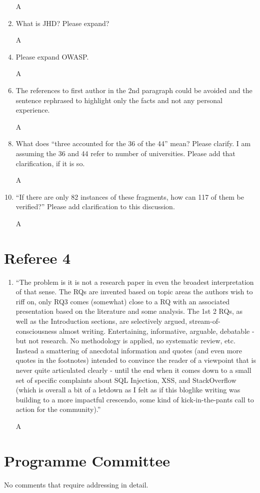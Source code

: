 \documentclass{article}
\begin{document}
\begin{enumerate}
\item[A]
\item  What is JHD? Please expand?
\item[A]
\item Please expand OWASP. 
\item[A]
\item 
The references to first author in the 2nd paragraph could be avoided and the sentence rephrased to highlight only the facts and not any personal experience. 
\item[A]
\item 
 What does ``three accounted for the 36 of the 44'' mean? Please clarify. I am assuming the 36 and 44 refer to number of universities. Please add that clarification, if it is so.
\item[A]
\item 
``If there are only 82 instances of these fragments, how can 117 of them be verified?'' Please add clarification to this discussion.
\item[A]
\end{enumerate}
\section{Referee 4}
\begin{enumerate}
\item ``The problem is it is not a research paper in even the broadest interpretation of that sense. The RQs are invented based on topic areas the authors wish to riff on, only RQ3 comes (somewhat) close to a RQ with an associated presentation based on the literature and some analysis. The 1st 2 RQs, as well as the Introduction sections, are selectively argued, stream-of-consciousness almost writing. Entertaining, informative, arguable, debatable - but not research. No methodology is applied, no systematic review, etc. Instead a smattering of anecdotal information and quotes (and even more quotes in the footnotes) intended to convince the reader of a viewpoint that is never quite articulated clearly - until the end when it comes down to a small set of specific complaints about SQL Injection, XSS, and StackOverflow (which is overall a bit of a letdown as I felt as if this bloglike writing was building to a more impactful crescendo, some kind of kick-in-the-pants call to action for the community).''
\item[A]
\end{enumerate}
\section{Programme Committee}
No comments that require addressing in detail.
\end{document}
